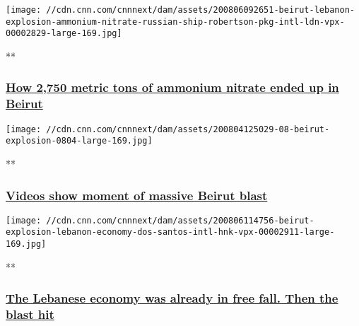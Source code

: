 \href{/videos/world/2020/08/06/beirut-lebanon-explosion-ammonium-nitrate-russian-ship-robertson-pkg-intl-ldn-vpx.cnn/video/playlists/beirut-explosion/}{}

\texttt{[image: //cdn.cnn.com/cnnnext/dam/assets/200806092651-beirut-lebanon-explosion-ammonium-nitrate-russian-ship-robertson-pkg-intl-ldn-vpx-00002829-large-169.jpg]}

**

\hypertarget{how-2750-metric-tons-of-ammonium-nitrate-ended-up-in-beirut}{%
\subsubsection{\texorpdfstring{\href{/videos/world/2020/08/06/beirut-lebanon-explosion-ammonium-nitrate-russian-ship-robertson-pkg-intl-ldn-vpx.cnn/video/playlists/beirut-explosion/}{How
2,750 metric tons of ammonium nitrate ended up in
Beirut}}{How 2,750 metric tons of ammonium nitrate ended up in Beirut}}\label{how-2750-metric-tons-of-ammonium-nitrate-ended-up-in-beirut}}

\href{/videos/world/2020/08/04/beirut-explosion-moment-of-blast-witness-ctw-vpx.cnn/video/playlists/beirut-explosion/}{}

\texttt{[image: //cdn.cnn.com/cnnnext/dam/assets/200804125029-08-beirut-explosion-0804-large-169.jpg]}

**

\hypertarget{videos-show-moment-of-massive-beirut-blast}{%
\subsubsection{\texorpdfstring{\href{/videos/world/2020/08/04/beirut-explosion-moment-of-blast-witness-ctw-vpx.cnn/video/playlists/beirut-explosion/}{Videos
show moment of massive Beirut
blast}}{Videos show moment of massive Beirut blast}}\label{videos-show-moment-of-massive-beirut-blast}}

\href{/videos/business/2020/08/06/beirut-explosion-lebanon-economy-dos-santos-intl-hnk-vpx.cnn/video/playlists/beirut-explosion/}{}

\texttt{[image: //cdn.cnn.com/cnnnext/dam/assets/200806114756-beirut-explosion-lebanon-economy-dos-santos-intl-hnk-vpx-00002911-large-169.jpg]}

**

\hypertarget{the-lebanese-economy-was-already-in-free-fall-then-the-blast-hit}{%
\subsubsection{\texorpdfstring{\href{/videos/business/2020/08/06/beirut-explosion-lebanon-economy-dos-santos-intl-hnk-vpx.cnn/video/playlists/beirut-explosion/}{The
Lebanese economy was already in free fall. Then the blast
hit}}{The Lebanese economy was already in free fall. Then the blast hit}}\label{the-lebanese-economy-was-already-in-free-fall-then-the-blast-hit}}

